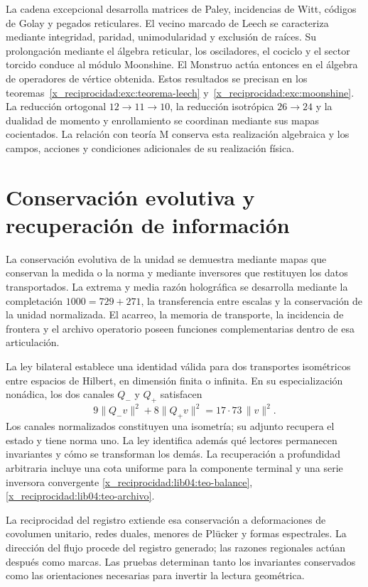 La cadena excepcional desarrolla matrices de Paley, incidencias de
Witt, códigos de Golay y pegados reticulares. El vecino marcado de
Leech se caracteriza mediante integridad, paridad, unimodularidad y
exclusión de raíces. Su prolongación mediante el álgebra reticular,
los osciladores, el cociclo y el sector torcido conduce al módulo
Moonshine. El Monstruo actúa entonces en el álgebra de operadores de
vértice obtenida. Estos resultados se precisan en los
teoremas~\ref{x_reciprocidad:exc:teorema-leech}
y~\ref{x_reciprocidad:exc:moonshine}.
La reducción ortogonal \(12\to11\to10\), la reducción
isotrópica \(26\to24\) y la dualidad de momento y enrollamiento
se coordinan mediante sus mapas cocientados. La relación con
teoría M conserva esta realización algebraica y los campos,
acciones y condiciones adicionales de su realización física.

\section*{Conservación evolutiva y recuperación de información}

La conservación evolutiva de la unidad se demuestra mediante mapas
que conservan la medida o la norma y mediante inversores que
restituyen los datos transportados. La extrema y media razón
holográfica se desarrolla mediante la completación
\(1000=729+271\), la transferencia entre escalas y la conservación
de la unidad normalizada. El acarreo, la memoria de transporte, la
incidencia de frontera y el archivo operatorio poseen funciones
complementarias dentro de esa articulación.

La ley bilateral establece una identidad válida para dos transportes
isométricos entre espacios de Hilbert, en dimensión finita o infinita.
En su especialización nonádica, los dos canales \(Q_-\) y \(Q_+\)
satisfacen
\[
 9\|Q_-v\|^2+8\|Q_+v\|^2
 =17\cdot73\,\|v\|^2.
\]
Los canales normalizados constituyen una isometría; su adjunto
recupera el estado y tiene norma uno. La ley identifica además
qué lectores permanecen invariantes y cómo se transforman los
demás. La recuperación a profundidad arbitraria incluye una cota
uniforme para la componente terminal y una serie inversora convergente
\ref{x_reciprocidad:lib04:teo-balance},
\ref{x_reciprocidad:lib04:teo-archivo}.

La reciprocidad del registro extiende esa conservación a deformaciones
de covolumen unitario, redes duales, menores de Plücker y formas
espectrales. La dirección del flujo procede del registro generado;
las razones regionales actúan después como marcas. Las pruebas
determinan tanto los invariantes conservados como las orientaciones
necesarias para invertir la lectura geométrica.


